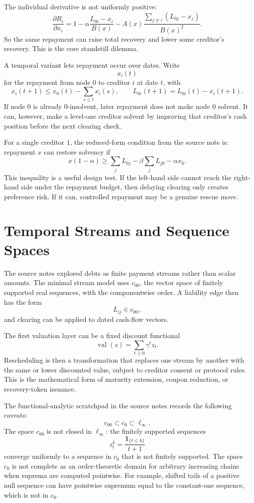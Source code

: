 \documentclass[11pt,oneside]{article}
\begin{document}
The individual derivative is not uniformly positive:
\[
  \frac{\partial R_i}{\partial x_i}
  =
  1
  -\alpha\frac{L_{0i}-x_i}{B(x)}
  -
  A(x)
  \frac{\sum_{j\neq i}(L_{0j}-x_j)}{B(x)^2}.
\]
So the same repayment can raise total recovery and lower some creditor's
recovery. This is the core standstill dilemma.

A temporal variant lets repayment occur over dates. Write
\[
  x_i(t)
\]
for the repayment from node $0$ to creditor $i$ at date $t$, with
\[
  x_i(t+1)\leq x_0(t)-\sum_{s\leq t}x_i(s),
  \qquad
  L_{0i}(t+1)=L_{0i}(t)-x_i(t+1).
\]
If node $0$ is already $0$-insolvent, later repayment does not make node $0$
solvent. It can, however, make a level-one creditor solvent by improving that
creditor's cash position before the next clearing check.

For a single creditor $1$, the reduced-form condition from the source note is:
repayment $x$ can restore solvency if
\[
  x(1-\alpha)
  \geq
  \sum_jL_{0j}
  -
  \beta\sum_jL_{j0}
  -
  \alpha x_0.
\]
This inequality is a useful design test. If the left-hand side cannot reach the
right-hand side under the repayment budget, then delaying clearing only creates
preference risk. If it can, controlled repayment may be a genuine rescue move.

\section{Temporal Streams and Sequence Spaces}

The source notes explored debts as finite payment streams rather than scalar
amounts. The minimal stream model uses $c_{00}$, the vector space of finitely
supported real sequences, with the componentwise order. A liability edge then
has the form
\[
  L_{ij}\in c_{00},
\]
and clearing can be applied to dated cash-flow vectors.

The first valuation layer can be a fixed discount functional
\[
  \operatorname{val}(z)=\sum_{t\geq0}\gamma^t z_t.
\]
Rescheduling is then a transformation that replaces one stream by another with
the same or lower discounted value, subject to creditor consent or protocol
rules. This is the mathematical form of maturity extension, coupon reduction,
or recovery-token issuance.

The functional-analytic scratchpad in the source notes records the following
caveats:
\[
  c_{00}\subset c_0\subset \ell_\infty.
\]
The space $c_{00}$ is not closed in $\ell_\infty$: the finitely supported
sequences
\[
  z^k_t=\frac{\mathbf 1_{\{t\leq k\}}}{t+1}
\]
converge uniformly to a sequence in $c_0$ that is not finitely supported. The
space $c_0$ is not complete as an order-theoretic domain for arbitrary
increasing chains when suprema are computed pointwise. For example, shifted
tails of a positive null sequence can have pointwise supremum equal to the
constant-one sequence, which is not in $c_0$.
\end{document}
